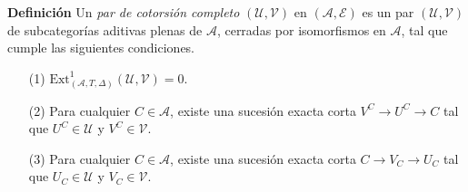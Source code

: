 \documentclass[preview]{standalone}
\begin{document}
\begin{center}
\justifying \textbf{Definición} Un \emph{par de cotorsión completo} $(\mathcal{U}, \mathcal{V})$ en $(\mathscr{A}, \mathscr{E})$ es un par $(\mathcal{U}, \mathcal{V})$ de subcategorías aditivas plenas de $\mathscr{A}$, cerradas por isomorfismos en $\mathscr{A}$, tal que cumple las siguientes condiciones.\begin{itemize} \item[(1)] $\text{Ext}^1_{(\mathscr{A}, T, \Delta)}(\mathcal{U}, \mathcal{V}) = 0$. \item[(2)] Para cualquier $C\in\mathscr{A}$, existe una sucesión exacta corta $V^C\to U^C\to C$ tal que $U^C\in\mathcal{U}$ y $V^C\in\mathcal{V}$. \item[(3)] Para cualquier $C\in\mathscr{A}$, existe una sucesión exacta corta $C\to V_C\to U_C$ tal que $U_C\in\mathcal{U}$ y $V_C\in\mathcal{V}$. \end{itemize}
\end{center}
\end{document}
